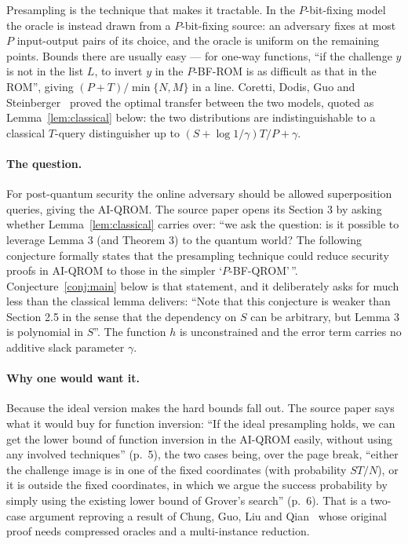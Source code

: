\documentclass{aicr-conjecture}
\begin{document}
Presampling is the technique that makes it tractable. In the
$P$-bit-fixing model the oracle is instead drawn from a $P$-bit-fixing
source: an adversary fixes at most $P$ input-output pairs of its
choice, and the oracle is uniform on the remaining points. Bounds there
are usually easy --- for one-way functions, ``if the challenge $y$ is
not in the list $L$, to invert $y$ in the $P$-BF-ROM is as difficult as
that in the ROM'', giving $(P+T)/\min\{N,M\}$ in a line. Coretti, Dodis,
Guo and Steinberger~\cite{CDGS18} proved the optimal transfer between
the two models, quoted as Lemma~\ref{lem:classical} below: the two
distributions are indistinguishable to a classical $T$-query
distinguisher up to $(S + \log 1/\gamma)T/P + \gamma$.

\paragraph{The question.}
For post-quantum security the online adversary should be allowed
superposition queries, giving the AI-QROM\@. The source paper opens its
Section 3 by asking whether Lemma~\ref{lem:classical} carries over: ``we
ask the question: is it possible to leverage Lemma 3 (and Theorem 3) to
the quantum world? The following conjecture formally states that the
presampling technique could reduce security proofs in AI-QROM to those
in the simpler `$P$-BF-QROM'\,''. Conjecture~\ref{conj:main} below is that
statement, and it deliberately asks for much less than the classical
lemma delivers: ``Note that this conjecture is weaker than Section 2.5
in the sense that the dependency on $S$ can be arbitrary, but Lemma 3 is
polynomial in $S$''. The function $h$ is unconstrained and the error
term carries no additive slack parameter $\gamma$.

\paragraph{Why one would want it.}
Because the ideal version makes the hard bounds fall out. The source
paper says what it would buy for function inversion: ``If the ideal
presampling holds, we can get the lower bound of function inversion in
the AI-QROM easily, without using any involved techniques'' (p.~5), the
two cases being, over the page break, ``either the challenge image is in
one of the fixed coordinates (with probability $ST/N$), or it is outside
the fixed coordinates, in which we argue the success probability by
simply using the existing lower bound of Grover's search'' (p.~6). That
is a two-case argument reproving a result of
Chung, Guo, Liu and Qian~\cite{CGLQ20} whose original proof needs
compressed oracles and a multi-instance reduction.
\end{document}
